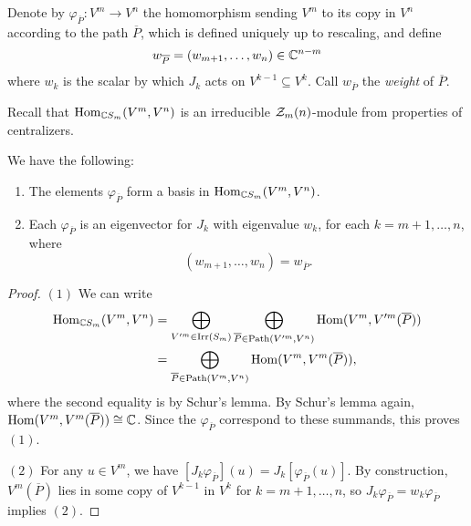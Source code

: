 \begin{definition}
  Denote by $\varphi_{\overline{P}} : V^m \to V^n$
  the homomorphism sending $V^m$ to
  its copy in $V^n$ according to the
  path $\overline{P}$, which is
  defined uniquely
  up to rescaling, and define
  \[
    w_{\overline{P}}
    = (w_{m + 1}, \dots, w_n)
    \in \mathbb{C}^{n - m}
  \]
  where $w_k$ is the scalar
  by which $J_k$ acts on $V^{k - 1} \subseteq V^k$.
  Call $w_{\overline{P}}$ the
  \emph{weight} of $\overline{P}$.
\end{definition}

\begin{remark}
  Recall that
  $\operatorname{Hom}_{\mathbb{C} S_m}(V^m, V^n)$ is an
  irreducible $\mathcal{Z}_m(n)$-module from
  properties of centralizers.
\end{remark}

\begin{lemma}
  We have the following:
  \begin{enumerate}
    \item The elements $\varphi_{\overline{P}}$
      form a basis in
      $\operatorname{Hom}_{\mathbb{C} S_m}(V^m, V^n)$.
    \item Each $\varphi_{\overline{P}}$
      is an eigenvector for $J_k$
      with eigenvalue $w_k$, for each
      $k = m + 1, \dots, n$, where
      \[
        (w_{m + 1}, \dots, w_n) = w_{\overline{P}}.
      \]
  \end{enumerate}
\end{lemma}

\begin{proof}
  $(1)$ We can write
  \begin{align*}
    \operatorname{Hom}_{\mathbb{C} S_m}(V^m, V^n)
    &= \bigoplus_{V'^m \in \operatorname{Irr}(S_m)}
    \bigoplus_{\overline{P} \in \operatorname{Path}(V'^m, V^n)}
    \operatorname{Hom}(V^m, V'^m(\overline{P})) \\
    &= \bigoplus_{\overline{P} \in \operatorname{Path}(V^m, V^n)}
    \operatorname{Hom}(V^m, V^m(\overline{P})),
  \end{align*}
  where the second equality is
  by Schur's lemma. By
  Schur's lemma again,
  $\operatorname{Hom}(V^m, V^m(\overline{P})) \cong \mathbb{C}$.
  Since the $\varphi_{\overline{P}}$
  correspond to these summands, this
  proves $(1)$.

  $(2)$ For any $u \in V^m$, we have
  $[J_k \varphi_{\overline{P}}](u) = J_k [\varphi_{\overline{P}}(u)]$.
  By construction, $V^m(\overline{P})$
  lies in some copy of $V^{k - 1}$ in
  $V^k$ for $k = m + 1, \dots, n$,
  so $J_k \varphi_{\overline{P}} = w_k \varphi_{\overline{P}}$
  implies $(2)$.
\end{proof}

